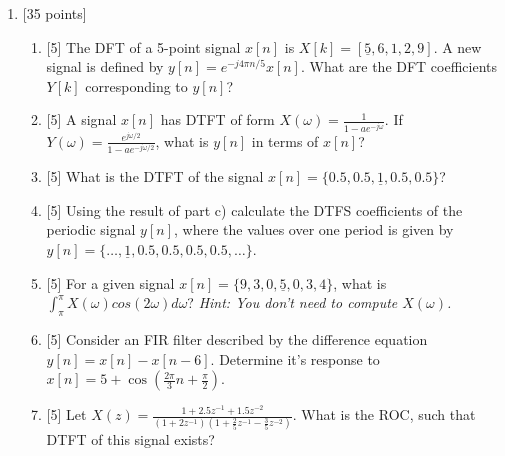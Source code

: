 \documentclass{article}
\begin{document}
\begin{enumerate}
    \item  {[35 points]}
    \begin{enumerate}
        \item {[5]} The DFT of a 5-point signal $x[n]$ is $X[k] = [\underline{5},6,1,2,9]$. A new signal is defined by $y[n]=e^{-j4\pi n/5}x[n]$. What are the DFT coefficients $Y[k]$ corresponding to $y[n]$? 
        \vspace{1in}
        \item {[5]} A signal $x[n]$ has DTFT of form $X(\omega) = \frac{1}{1-ae^{-j\omega}}$. If $Y(\omega) = \frac{e^{j\omega/2}}{1-ae^{-j\omega/2}}$, what is $y[n]$ in terms of $x[n]$?
        \vspace{1in}
        \item {[5]} What is the DTFT of the signal $x[n] = \{0.5,0.5,\underline{1},0.5,0.5\}$? 
        \vspace{1in}
        \item {[5]} Using the result of part c) calculate the DTFS coefficients of the periodic signal $y[n]$, where the values over one period is given by $y[n] = \{\dots,\underline{1},0.5,0.5,0.5,0.5,\dots\}$.
        \vspace{2in}
        \item {[5]} For a given signal $x[n] = \{9,3,0,\underline{5},0,3,4\}$, what is $\int_{\pi}^\pi X(\omega) cos(2\omega) d\omega$? {\it Hint: You don't need to compute $X(\omega)$.}
        \vspace{1in}
        \item {[5]} Consider an FIR filter described by the difference equation $y[n] = x[n]-x[n-6]$. Determine it's response to $x[n] = 5 + \cos\left(\frac{2\pi}{3}n+\frac{\pi}{2}\right)$.
        \vspace{1in}
        \item {[5]} Let $X(z)=\frac{1+2.5z^{-1}+1.5z^{-2}}{(1+2z^{-1})\left(1+\frac{2}{5}z^{-1}-\frac{3}{5}z^{-2}\right)}$. What is the ROC, such that DTFT of this signal exists?
    \end{enumerate}


\end{enumerate}
\end{document}
